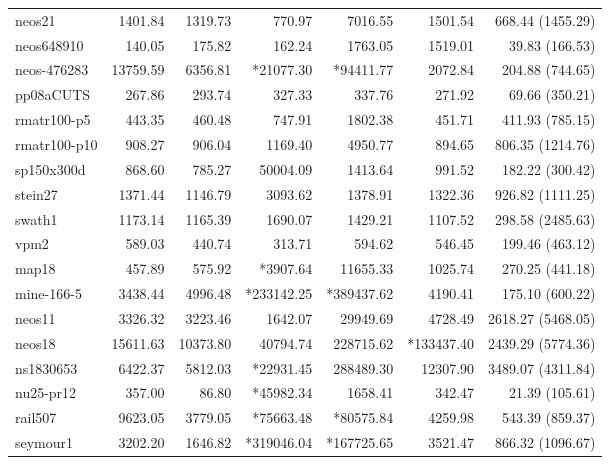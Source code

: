 \documentclass[letterpaper]{article} %
\begin{document}
\begin{table*}[!t]
\begin{footnotesize}
\begin{tabular}{lrrrrrr}
             neos21 &     1401.84 &   1319.73 &  770.97 &    7016.55 &    1501.54 &     668.44 (1455.29) \\
         neos648910 &      140.05 &    175.82 &  162.24 &    1763.05 &    1519.01 &      39.83 (166.53) \\
        neos-476283 &    13759.59 &   6356.81 & *21077.30  &   *94411.77 &    2072.84 &     204.88 (744.65) \\
          pp08aCUTS &      267.86 &    293.74 &  327.33 &     337.76 &     271.92 &      69.66 (350.21) \\
        rmatr100-p5 &      443.35 &    460.48 &  747.91 &    1802.38 &     451.71 &     411.93 (785.15) \\
      rmatr100-p10 &      908.27 &    906.04 &  1169.40 &    4950.77 &     894.65 &     806.35 (1214.76) \\
         sp150x300d &      868.60 &    785.27 &  50004.09 &    1413.64 &     991.52 &     182.22 (300.42) \\
            stein27 &     1371.44 &   1146.79 &  3093.62 &    1378.91 &    1322.36 &     926.82 (1111.25) \\
             swath1 &     1173.14 &   1165.39 &  1690.07 &    1429.21 &    1107.52 &     298.58 (2485.63) \\
              vpm2 &      589.03 &    440.74 &  313.71 &     594.62 &     546.45 &     199.46 (463.12) \\
\midrule
              map18 &       457.89 &    575.92 &  *3907.64 &   11655.33 &    1025.74 &     270.25 (441.18) \\
         mine-166-5 &      3438.44 &   4996.48 &  *233142.25 &  *389437.62 &    4190.41 &     175.10 (600.22) \\
             neos11 &      3326.32 &   3223.46 &  1642.07 &   29949.69 &    4728.49 &    2618.27 (5468.05) \\
             neos18 &     15611.63 &  10373.80 &  40794.74 &  228715.62 &  *133437.40 &    2439.29 (5774.36) \\
          ns1830653 &      6422.37 &   5812.03 &  *22931.45 &  288489.30 &   12307.90 &    3489.07 (4311.84) \\
          nu25-pr12 &       357.00 &     86.80 &  *45982.34 &    1658.41 &     342.47 &      21.39 (105.61) \\
            rail507 &      9623.05 &   3779.05 &  *75663.48 &   *80575.84 &    4259.98 &     543.39 (859.37) \\
           seymour1 &      3202.20 &   1646.82 &  *319046.04 &  *167725.65 &    3521.47 &     866.32 (1096.67) \\
\bottomrule
\end{tabular}
\end{footnotesize}
\end{table*}
\end{document}

